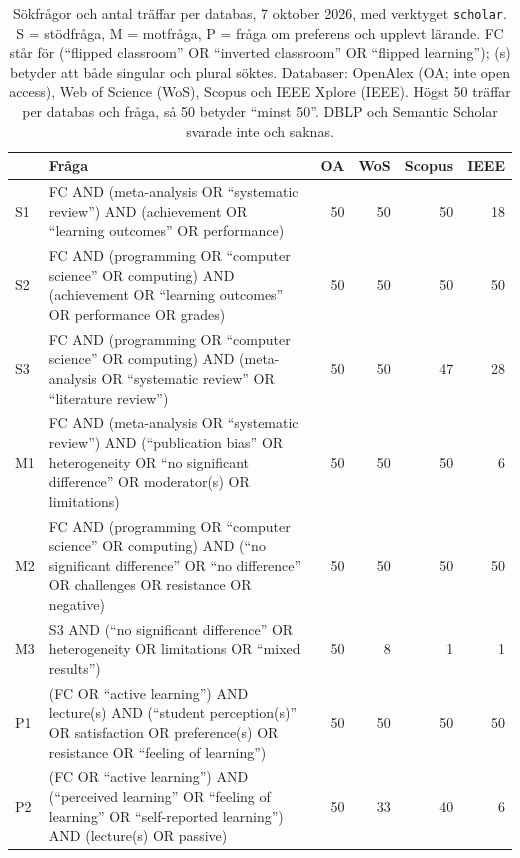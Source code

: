 \begin{table}[htbp]
  \centering\footnotesize
  \caption{Sökfrågor och antal träffar per databas, 7 oktober 2026, med
    verktyget \texttt{scholar}. S = stödfråga, M = motfråga, P = fråga om
    preferens och upplevt lärande. FC står för (\enquote{flipped
    classroom} OR \enquote{inverted classroom} OR \enquote{flipped
    learning}); (s) betyder att både singular och plural söktes.
    Databaser: OpenAlex (OA; inte \foreignlanguage{english}{open access}),
    Web of Science (WoS), Scopus och IEEE Xplore (IEEE). Högst 50 träffar
    per databas och fråga, så 50 betyder \enquote{minst 50}. DBLP och
    Semantic Scholar svarade inte och saknas.}
  \label{tab:recap-flippat-fragor}
  \begin{tabularx}{\linewidth}{@{}l>{\raggedright\arraybackslash}X rrrr@{}}
    \toprule
    & Fråga & OA & WoS & Scopus & IEEE \\
    \midrule
    S1 & FC AND (meta-analysis OR \enquote{systematic review}) AND
      (achievement OR \enquote{learning outcomes} OR performance)
      & 50 & 50 & 50 & 18 \\
    S2 & FC AND (programming OR \enquote{computer science} OR computing)
      AND (achievement OR \enquote{learning outcomes} OR performance OR
      grades) & 50 & 50 & 50 & 50 \\
    S3 & FC AND (programming OR \enquote{computer science} OR computing)
      AND (meta-analysis OR \enquote{systematic review} OR
      \enquote{literature review}) & 50 & 50 & 47 & 28 \\
    M1 & FC AND (meta-analysis OR \enquote{systematic review}) AND
      (\enquote{publication bias} OR heterogeneity OR \enquote{no
      significant difference} OR moderator(s) OR limitations)
      & 50 & 50 & 50 & 6 \\
    M2 & FC AND (programming OR \enquote{computer science} OR computing)
      AND (\enquote{no significant difference} OR \enquote{no difference}
      OR challenges OR resistance OR negative) & 50 & 50 & 50 & 50 \\
    M3 & S3 AND (\enquote{no significant difference} OR heterogeneity OR
      limitations OR \enquote{mixed results}) & 50 & 8 & 1 & 1 \\
    P1 & (FC OR \enquote{active learning}) AND lecture(s) AND
      (\enquote{student perception(s)} OR satisfaction OR preference(s) OR
      resistance OR \enquote{feeling of learning}) & 50 & 50 & 50 & 50 \\
    P2 & (FC OR \enquote{active learning}) AND (\enquote{perceived
      learning} OR \enquote{feeling of learning} OR \enquote{self-reported
      learning}) AND (lecture(s) OR passive) & 50 & 33 & 40 & 6 \\
    \bottomrule
  \end{tabularx}
\end{table}

